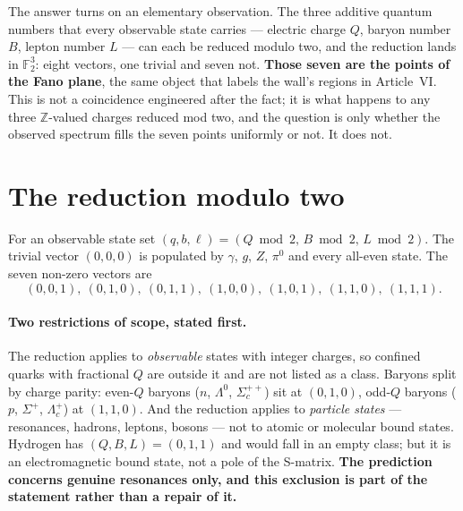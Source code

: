 The answer turns on an elementary observation. The three additive quantum numbers that every observable state carries --- electric charge $Q$, baryon number $B$, lepton number $L$ --- can each be reduced modulo two, and the reduction lands in $\mathbb F_2^3$: eight vectors, one trivial and seven not. \textbf{Those seven are the points of the Fano plane}, the same object that labels the wall's regions in Article~VI. This is not a coincidence engineered after the fact; it is what happens to any three $\mathbb Z$-valued charges reduced mod two, and the question is only whether the observed spectrum fills the seven points uniformly or not. It does not.

\section{The reduction modulo two}
For an observable state set $(q,b,\ell)=(Q\bmod2,\,B\bmod2,\,L\bmod2)$. The trivial vector $(0,0,0)$ is populated by $\gamma$, $g$, $Z$, $\pi^0$ and every all-even state. The seven non-zero vectors are
\begin{equation}
(0,0,1),\ (0,1,0),\ (0,1,1),\ (1,0,0),\ (1,0,1),\ (1,1,0),\ (1,1,1).
\end{equation}

\paragraph{Two restrictions of scope, stated first.} The reduction applies to \emph{observable} states with integer charges, so confined quarks with fractional $Q$ are outside it and are not listed as a class. Baryons split by charge parity: even-$Q$ baryons ($n$, $\Lambda^0$, $\Sigma_c^{++}$) sit at $(0,1,0)$, odd-$Q$ baryons ($p$, $\Sigma^+$, $\Lambda_c^+$) at $(1,1,0)$. And the reduction applies to \emph{particle states} --- resonances, hadrons, leptons, bosons --- not to atomic or molecular bound states. Hydrogen has $(Q,B,L)=(0,1,1)$ and would fall in an empty class; but it is an electromagnetic bound state, not a pole of the S-matrix. \textbf{The prediction concerns genuine resonances only, and this exclusion is part of the statement rather than a repair of it.}

